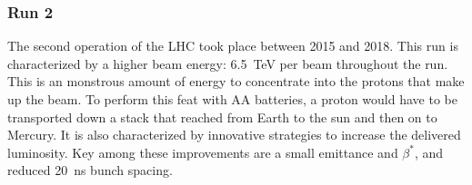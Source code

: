 
\subsubsection{Run 2}

The second operation of the LHC took place between 2015 and 2018.
This run is characterized by a higher beam energy: 6.5~TeV per beam throughout the run.
This is an monstrous amount of energy to concentrate into the protons that make up the beam.
To perform this feat with AA batteries, a proton would have to be transported down a stack that reached from Earth to the sun and then on to Mercury.
It is also characterized by innovative strategies to increase the delivered luminosity.
Key among these improvements are a small emittance and $\beta^*$, and reduced 20~ns bunch spacing.

